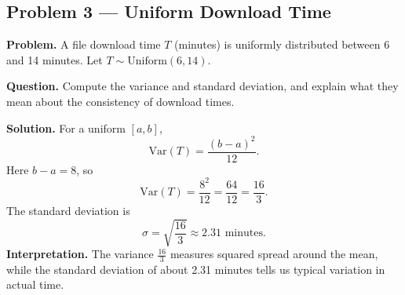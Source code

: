 \begin{ExamProblems}
		
		\hypertarget{c4-ex3}{}
		\item
		\subsection*{Problem 3 — Uniform Download Time}
		
		\textbf{Problem.}
		A file download time \(T\) (minutes) is uniformly distributed between 6 and 14 minutes.
		Let \(T\sim\text{Uniform}(6,14)\).
		
		\textbf{Question.} Compute the variance and standard deviation, and explain what they mean
		about the consistency of download times.
		
		\textbf{Solution.}
		For a uniform \([a,b]\),
		\[
		\mathrm{Var}(T)=\frac{(b-a)^2}{12}.
		\]
		Here \(b-a=8\), so
		\[
		\mathrm{Var}(T)=\frac{8^2}{12}=\frac{64}{12}=\frac{16}{3}.
		\]
		The standard deviation is
		\[
		\sigma=\sqrt{\frac{16}{3}}\approx 2.31\text{ minutes}.
		\]
		\textbf{Interpretation.} The variance \(\frac{16}{3}\) measures squared spread around the mean,
		while the standard deviation of about 2.31 minutes tells us typical variation in actual time.
		
	\end{ExamProblems}
	
	
